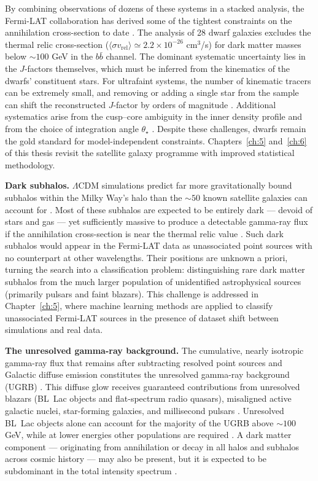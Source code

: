 By combining observations of dozens of these systems in a stacked analysis, the Fermi-LAT collaboration has derived some of the tightest constraints on the annihilation cross-section to date \cite{Fermi-LAT:2015att,Hooper:2024}.
The analysis of 28 dwarf galaxies excludes the thermal relic cross-section ($\langle \sigma v_\text{rel} \rangle \simeq 2.2 \times 10^{-26}$ cm$^3$/s) for dark matter masses below $\sim 100$ GeV in the $b\bar{b}$ channel.
The dominant systematic uncertainty lies in the $J$-factors themselves, which must be inferred from the kinematics of the dwarfs' constituent stars.
For ultrafaint systems, the number of kinematic tracers can be extremely small, and removing or adding a single star from the sample can shift the reconstructed $J$-factor by orders of magnitude \cite{Cirelli:2024ssz}.
Additional systematics arise from the cusp--core ambiguity in the inner density profile and from the choice of integration angle $\theta_\star$ \cite{Cirelli:2024ssz}.
Despite these challenges, dwarfs remain the gold standard for model-independent constraints.
Chapters~\ref{ch:5} and~\ref{ch:6} of this thesis revisit the satellite galaxy programme with improved statistical methodology.

\textbf{Dark subhalos.} $\Lambda$CDM simulations predict far more gravitationally bound subhalos within the Milky Way's halo than the $\sim 50$ known satellite galaxies can account for \cite{Cirelli:2024ssz}.
Most of these subhalos are expected to be entirely dark --- devoid of stars and gas --- yet sufficiently massive to produce a detectable gamma-ray flux if the annihilation cross-section is near the thermal relic value \cite{Cirelli:2024ssz}.
Such dark subhalos would appear in the Fermi-LAT data as unassociated point sources with no counterpart at other wavelengths.
Their positions are unknown a priori, turning the search into a classification problem: distinguishing rare dark matter subhalos from the much larger population of unidentified astrophysical sources (primarily pulsars and faint blazars).
This challenge is addressed in Chapter~\ref{ch:5}, where machine learning methods are applied to classify unassociated Fermi-LAT sources in the presence of dataset shift between simulations and real data.

\textbf{The unresolved gamma-ray background.}
The cumulative, nearly isotropic gamma-ray flux that remains after subtracting resolved point sources and Galactic diffuse emission constitutes the unresolved gamma-ray background (UGRB) \cite{DGRB-review}.
This diffuse glow receives guaranteed contributions from unresolved blazars (BL~Lac objects and flat-spectrum radio quasars), misaligned active galactic nuclei, star-forming galaxies, and millisecond pulsars \cite{DGRB-review}.
Unresolved BL~Lac objects alone can account for the majority of the UGRB above $\sim 100$ GeV, while at lower energies other populations are required \cite{DGRB-review}.
A dark matter component --- originating from annihilation or decay in all halos and subhalos across cosmic history --- may also be present, but it is expected to be subdominant in the total intensity spectrum \cite{DGRB-review,Cirelli:2024ssz}.

